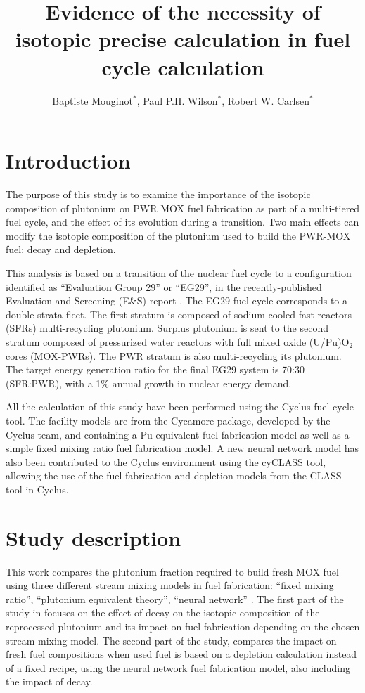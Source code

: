 \documentclass{anstrans}
\title{Evidence of the necessity of isotopic precise calculation in fuel cycle
calculation}
\author{ Baptiste Mouginot$^{*}$, Paul P.H. Wilson$^{*}$, Robert W. Carlsen$^{*}$ }
\institute{
$^{*}$University of Wisconsin-Madison, WI
\and
}
\begin{document}
\section{Introduction} 

The purpose of this study is to examine the importance of the isotopic
composition of plutonium on PWR MOX fuel fabrication as part of a multi-tiered
fuel cycle, and the effect of its evolution during a transition. Two main
effects can modify the isotopic composition of the plutonium used to build the
PWR-MOX fuel: decay and depletion.

This analysis is based on a transition of the nuclear fuel cycle
to a configuration identified as ``Evaluation Group 29'' or ``EG29'', in the
recently-published Evaluation and Screening (E\&S) report \cite{ES}.  The EG29 fuel
cycle corresponds to a double strata fleet. The first stratum is composed of
sodium-cooled fast reactors (SFRs) multi-recycling plutonium. Surplus
plutonium is sent to the second stratum composed of pressurized water
reactors with full mixed oxide (U/Pu)O$_{2}$ cores (MOX-PWRs).  The PWR stratum
is also multi-recycling its plutonium. The target energy generation ratio for
the final EG29 system is 70:30 (SFR:PWR), with a 1\% annual growth in nuclear
energy demand.


All the calculation of this study have been performed using the Cyclus fuel cycle
tool\cite{CYCLUS}. The facility models are from the Cycamore package, developed by the
Cyclus team, and containing a Pu-equivalent fuel fabrication model as well as
a simple fixed mixing ratio fuel fabrication model. A new neural network model has
also been contributed to the Cyclus environment using the cyCLASS tool\cite{cyCLASS}, 
allowing the use of the fuel fabrication and depletion models from the CLASS tool
\cite{CLASS} in Cyclus.


\section{Study description}

This work compares the plutonium fraction required to build fresh MOX fuel
using three different stream mixing models in fuel fabrication: ``fixed mixing
ratio'', ``plutonium equivalent theory'', ``neural network'' \cite{Leniau2015125}.
The first part of the study in focuses on the effect of decay on the isotopic
composition of the reprocessed plutonium and its impact on fuel fabrication
depending on the chosen stream mixing model.  The second part of the study,
compares the impact on fresh fuel compositions when used fuel is based on a
depletion calculation instead of a fixed recipe, using the neural network fuel
fabrication model, also including the impact of decay.
\end{document}

